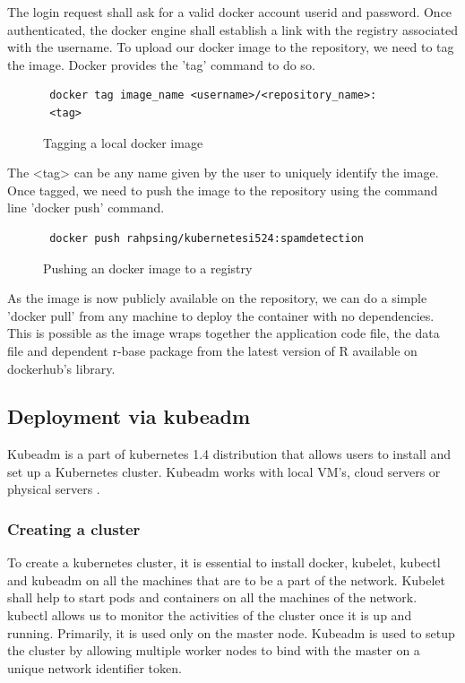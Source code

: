 \documentclass[9pt,twocolumn,twoside]{../../styles/osajnl}
\begin{document}
The login request shall ask for a valid docker account userid and
password. Once authenticated, the docker engine shall establish a link
with the registry associated with the username.  To upload our docker
image to the repository, we need to tag the image. Docker provides the
'tag' command to do so.

\begin{figure}[H]
\begin{verbatim}
 docker tag image_name <username>/<repository_name>:
 <tag>
\end{verbatim}
\caption{Tagging a local docker image}
\label{Tagging a local docker image}
\end{figure}


The <tag> can be any name given by the user to uniquely identify the
image. Once tagged, we need to push the image to the repository using
the command line 'docker push' command.

\begin{figure}[H]
\begin{verbatim}
 docker push rahpsing/kubernetesi524:spamdetection
\end{verbatim}
\caption{Pushing an docker image to a registry}
\label{Pushing an docker image to a registry}
\end{figure}

As the image is now publicly available on the repository, we can do a
simple 'docker pull' from any machine to deploy the container with no
dependencies. This is possible as the image wraps together the
application code file, the data file and dependent r-base package from
the latest version of R available on dockerhub's library.

\subsection{Deployment via kubeadm}

Kubeadm is a part of kubernetes 1.4 distribution that allows users to
install and set up a Kubernetes cluster. Kubeadm works with local
VM's, cloud servers or physical servers \cite{www-kubernetes-kubeadm}.

\subsubsection{Creating a cluster}
To create a kubernetes cluster, it is essential to install docker,
kubelet, kubectl and kubeadm on all the machines that are to be a part
of the network. Kubelet shall help to start pods and containers on all
the machines of the network.  kubectl allows us to monitor the
activities of the cluster once it is up and running. Primarily, it is
used only on the master node. Kubeadm is used to setup the cluster by
allowing multiple worker nodes to bind with the master on a unique
network identifier token.
\end{document}
